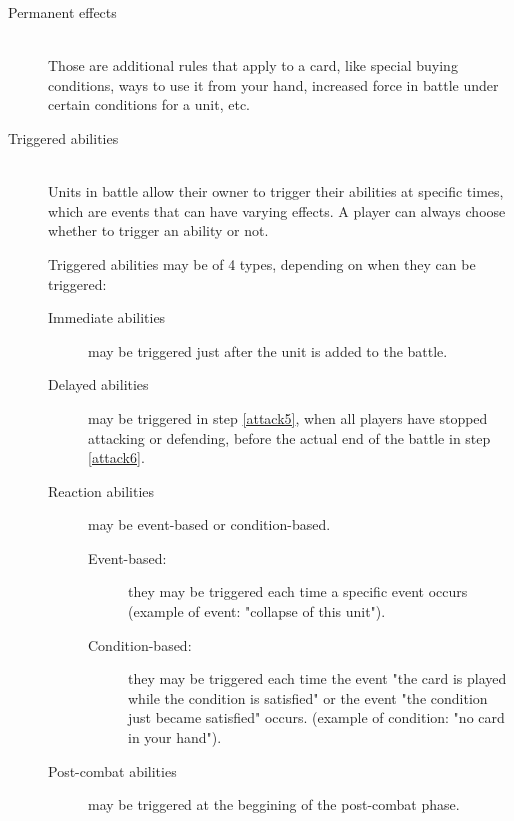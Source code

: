\documentclass[a4paper]{article}
\begin{document}
    \begin{description}
        \item[Permanent effects] \hfill \\
        	Those are additional rules that apply to a card,
            like special buying conditions, ways to use it from your hand, 
            increased force in battle under certain conditions for a unit, etc.
        \item[Triggered abilities] \hfill \\
            Units in battle allow their owner to trigger their abilities at
            specific times, which are events that can have varying effects.
            A player can always choose whether to trigger an ability or not.
            
            Triggered abilities may be of 4 types,
            depending on when they can be triggered:
            \begin{description}
        	        \item[Immediate abilities]
                    	may be triggered just after the unit is added to the battle.
        	        \item[Delayed abilities]
                    may be triggered in step \ref{attack5},
                     when all players have stopped attacking or defending,
	                before the actual end of the battle in step \ref{attack6}.
        	        \item[Reaction abilities] may be event-based or condition-based.
	                \begin{description}
                        \item[Event-based:]
                        they may be triggered each time a specific event occurs
                        (example of event: "collapse of this unit").
                        \item[Condition-based:]
                        they may be triggered each time the event
                        "the card is played while the condition is satisfied" or the
                        event "the condition just became satisfied" occurs.
                        (example of condition: "no card in your hand").
                    \end{description}
        	        \item[Post-combat abilities] may be triggered at the beggining of the
                    post-combat phase.
            \end{description}
    \end{description}
    
\end{document}
